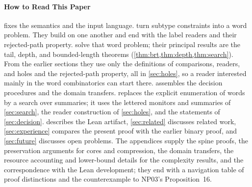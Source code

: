 \paragraph{How to Read This Paper}
 fixes the semantics and the input language.
 turn subtype constraints into a
word problem. They build on one another and end with the label readers and
their rejected-path property.  solve
that word problem; their principal results are the tail, depth, and
bounded-length theorems (\cref{thm:brt,thm:depth,thm:search}). From the
earlier sections they use only the definitions of comparisons, readers, and
holes and the rejected-path property, all in \cref{sec:holes}, so a reader
interested mainly in the word combinatorics can start there.
 assembles the decision procedures and the domain
transfers.  replaces the explicit enumeration of words
by a search over summaries; it uses the lettered monitors and summaries of
\cref{sec:search}, the reader construction of \cref{sec:holes}, and the
statements of \cref{sec:decision}.  describes the
Lean artifact, \cref{sec:related} discusses related work,
\cref{sec:experience} compares the present proof with the earlier binary
proof, and \cref{sec:future} discusses open problems. The appendices supply
the spine proofs, the preservation arguments for cores and compression, the
domain transfers, the resource accounting and lower-bound details for the
complexity results, and the correspondence with the Lean development; they
end with a navigation table of proof distinctions and the counterexample to
NP03's Proposition~16.
